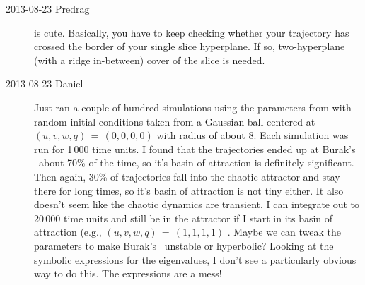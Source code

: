 \begin{description}




\item[2013-08-23 Predrag]
 is cute.
Basically, you have to keep checking whether your trajectory has
crossed the border of your single slice hyperplane. If so, two-hyperplane (with a ridge
in-between) cover of the slice is needed.


\item[2013-08-23 Daniel] Just ran a couple of hundred simulations
using the parameters from  with random
initial conditions taken from a Gaussian ball centered at
$(u,v,w,q)\, =\,(0,0,0,0)$ with radius of about 8. Each simulation
was run for 1\,000 time units. I found that the trajectories ended up
at Burak's \eqv\ about 70\% of the time, so it's basin of attraction
is definitely significant. Then again, 30\% of trajectories fall into
the chaotic attractor and stay there for long times, so it's basin of
attraction is not tiny either. It also doesn't seem like the chaotic
dynamics are transient. I can integrate out to 20\,000 time units and
still be in the attractor if I start in its basin of attraction
(e.g., $(u,v,w,q)\, =\,(1,1,1,1)$ . Maybe we can tweak the parameters
to make Burak's \eqv\ unstable or hyperbolic? Looking at the
symbolic expressions for the eigenvalues, I don't see a particularly
obvious way to do this. The expressions are a mess!


\end{description}
